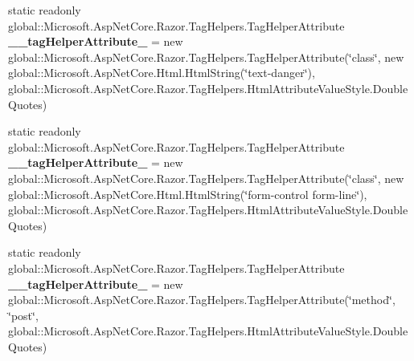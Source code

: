 \begin{DoxyCompactItemize}
\item 
\mbox{\label{class_projeto_e_s_w_1_1_areas_1_1_identity_1_1_pages_1_1_account_1_1_areas___identity___pages___account___register_afa0205f540718f4c5bd5828e31a278aa}} 
static readonly global\+::\+Microsoft.\+Asp\+Net\+Core.\+Razor.\+Tag\+Helpers.\+Tag\+Helper\+Attribute {\bfseries \+\_\+\+\_\+tag\+Helper\+Attribute\+\_} = new global\+::\+Microsoft.\+Asp\+Net\+Core.\+Razor.\+Tag\+Helpers.\+Tag\+Helper\+Attribute(\char`\"{}class\char`\"{}, new global\+::\+Microsoft.\+Asp\+Net\+Core.\+Html.\+Html\+String(\char`\"{}text-\/danger\char`\"{}), global\+::\+Microsoft.\+Asp\+Net\+Core.\+Razor.\+Tag\+Helpers.\+Html\+Attribute\+Value\+Style.\+Double\+Quotes)
\item 
\mbox{\label{class_projeto_e_s_w_1_1_areas_1_1_identity_1_1_pages_1_1_account_1_1_areas___identity___pages___account___register_aa703b3bd29b3e9c5bd577d9a2aa852e6}} 
static readonly global\+::\+Microsoft.\+Asp\+Net\+Core.\+Razor.\+Tag\+Helpers.\+Tag\+Helper\+Attribute {\bfseries \+\_\+\+\_\+tag\+Helper\+Attribute\+\_} = new global\+::\+Microsoft.\+Asp\+Net\+Core.\+Razor.\+Tag\+Helpers.\+Tag\+Helper\+Attribute(\char`\"{}class\char`\"{}, new global\+::\+Microsoft.\+Asp\+Net\+Core.\+Html.\+Html\+String(\char`\"{}form-\/control form-\/line\char`\"{}), global\+::\+Microsoft.\+Asp\+Net\+Core.\+Razor.\+Tag\+Helpers.\+Html\+Attribute\+Value\+Style.\+Double\+Quotes)
\item 
\mbox{\label{class_projeto_e_s_w_1_1_areas_1_1_identity_1_1_pages_1_1_account_1_1_areas___identity___pages___account___register_a6284e689bff0795ffbc657a776140062}} 
static readonly global\+::\+Microsoft.\+Asp\+Net\+Core.\+Razor.\+Tag\+Helpers.\+Tag\+Helper\+Attribute {\bfseries \+\_\+\+\_\+tag\+Helper\+Attribute\+\_} = new global\+::\+Microsoft.\+Asp\+Net\+Core.\+Razor.\+Tag\+Helpers.\+Tag\+Helper\+Attribute(\char`\"{}method\char`\"{}, \char`\"{}post\char`\"{}, global\+::\+Microsoft.\+Asp\+Net\+Core.\+Razor.\+Tag\+Helpers.\+Html\+Attribute\+Value\+Style.\+Double\+Quotes)
\item 

\end{DoxyCompactItemize}
